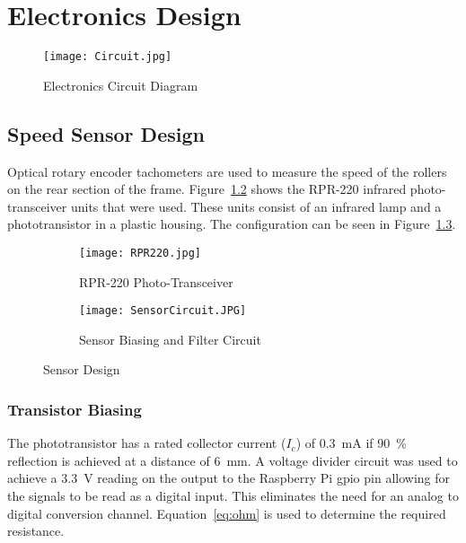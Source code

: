 \chapter{Electronics Design}
\label{ch:electronics}

\begin{figure}[H]
	\begin{center}
		\texttt{[image: Circuit.jpg]}
		\caption{Electronics Circuit Diagram}
		\label{fig:circ}
	\end{center}
\end{figure}

\section{Speed Sensor Design}

Optical rotary encoder tachometers are used to measure the speed of the rollers on the rear section of the frame. Figure~\ref{fig:rpr} shows the RPR-220 infrared photo-transceiver units that were used. These units consist of an infrared lamp and a phototransistor in a plastic housing. The configuration can be seen in Figure~\ref{fig:sensorD}.

\begin{figure}[H]
	\centering
	\begin{subfigure}[t]{.35\textwidth}
		\centering
		\texttt{[image: RPR220.jpg]}
		\caption{RPR-220 Photo-Transceiver}
		\citep[2015]{RPR:2015}
		\label{fig:rpr}
	\end{subfigure}
\hfill
	\begin{subfigure}[t]{.6\textwidth}
		\centering
		\texttt{[image: SensorCircuit.JPG]}
		\caption{Sensor Biasing and Filter Circuit}
		\label{fig:sensorD}
	\end{subfigure}
	\caption{Sensor Design}
	\label{fig:Sensor}
\end{figure}

\vspace*{-1cm}

\subsection{Transistor Biasing}

The phototransistor has a rated collector current ($I_c$) of \SI{0.3}{\milli\ampere} if \SI{90}{\percent} reflection is achieved at a distance of \SI{6}{\milli\meter}. A voltage divider circuit was used to achieve a \SI{3.3}{\volt} reading on the output to the Raspberry Pi \ac{gpio} pin allowing for the signals to be read as a digital input. This eliminates the need for an analog to digital conversion channel. Equation~\ref{eq:ohm} is used to determine the required resistance.

